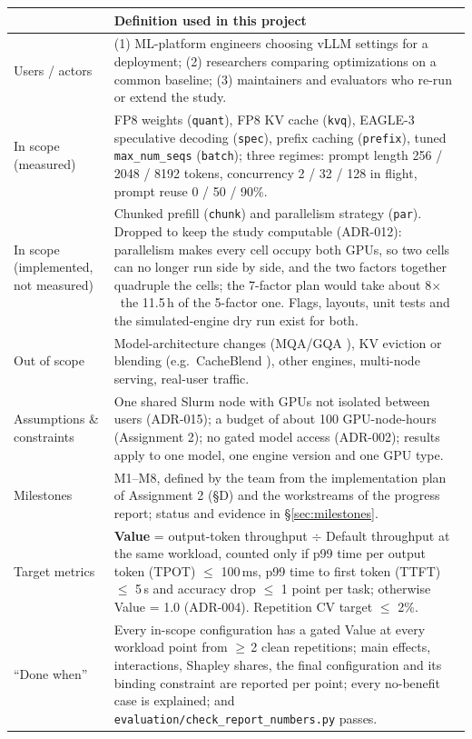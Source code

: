 \documentclass[10pt,a4paper]{article}
\newcommand{\hc}[1]{{\leavevmode\bfseries\color{ink}#1}}   %
\newcommand{\x}{\ensuremath{\times}}
\newcommand{\fp}[1]{{\leavevmode\urlstyle{tt}\color{codecol}\nolinkurl{#1}}}
\newcommand{\opt}[1]{\leavevmode\textcolor{codecol}{\texttt{#1}}}
\begin{document}
{\small
{
\begin{xltabular}{\linewidth}{@{}>{\bfseries\raggedright\arraybackslash}p{3.4cm}L@{}}
\toprule
\rowcolor{tblhead}\hc{Item} & \hc{Definition used in this project} \\
\midrule\endhead
Users / actors & (1) ML-platform engineers choosing vLLM settings for a deployment; (2) researchers comparing
optimizations on a common baseline; (3) maintainers and evaluators who re-run or extend the study. \\
In scope (measured) & FP8 weights (\opt{quant}), FP8 KV cache (\opt{kvq}), EAGLE-3 speculative decoding
(\opt{spec}), prefix caching (\opt{prefix}), tuned \texttt{max\_num\_seqs} (\opt{batch}); three regimes: prompt
length 256 / 2048 / 8192 tokens, concurrency 2 / 32 / 128 in flight, prompt reuse 0 / 50 / 90\%. \\
In scope (implemented, not measured) & Chunked prefill (\opt{chunk}) and parallelism strategy (\opt{par}).
Dropped to keep the study computable (ADR-012): parallelism makes every cell occupy both GPUs, so two cells can no
longer run side by side, and the two factors together quadruple the cells; the 7-factor plan would take about 8\x\
the 11.5\,h of the 5-factor one. Flags, layouts, unit tests and the simulated-engine dry run exist for both. \\
Out of scope & Model-architecture changes (MQA/GQA \cite{gqa}), KV eviction or blending (e.g.\ CacheBlend
\cite{cacheblend}), other engines, multi-node serving, real-user traffic. \\
Assumptions \& constraints & One shared Slurm node with GPUs not isolated between users (ADR-015); a budget of
about 100 GPU-node-hours (Assignment 2); no gated model access (ADR-002); results apply to one model, one engine
version and one GPU type. \\
Milestones & M1--M8, defined by the team from the implementation plan of Assignment 2 (\S D) and the workstreams of
the progress report; status and evidence in \S\ref{sec:milestones}. \\
Target metrics & \textbf{Value} = output-token throughput $\div$ Default throughput at the same workload, counted
only if p99 time per output token (TPOT) $\le$ 100\,ms, p99 time to first token (TTFT) $\le$ 5\,s and accuracy drop
$\le$ 1 point per task; otherwise Value = 1.0 (ADR-004). Repetition CV target $\le$ 2\%. \\
``Done when'' & Every in-scope configuration has a gated Value at every workload point from $\ge$\,2 clean
repetitions; main effects, interactions, Shapley shares, the final configuration and its binding constraint are
reported per point; every no-benefit case is explained; and \fp{evaluation/check_report_numbers.py} passes. \\
\bottomrule
\end{xltabular}}}
\end{document}
